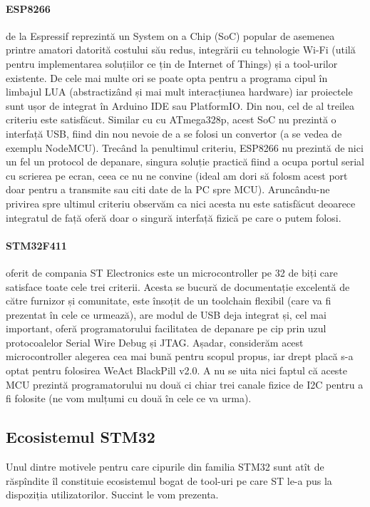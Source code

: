 \paragraph{ESP8266} de la Espressif reprezintă un System on a Chip (SoC) popular de asemenea printre amatori datorită costului său redus, integrării cu tehnologie Wi-Fi (utilă pentru implementarea soluțiilor ce țin de Internet of Things) și a tool-urilor existente. De cele mai multe ori se poate opta pentru a programa cipul în limbajul LUA (abstractizând și mai mult interacțiunea hardware) iar proiectele sunt ușor de integrat în Arduino IDE sau PlatformIO. Din nou, cel de al treilea criteriu este satisfăcut. Similar cu cu ATmega328p, acest SoC nu prezintă o interfață USB\cite{esp_tech}, fiind din nou nevoie de a se folosi un convertor (a se vedea de exemplu NodeMCU). Trecând la penultimul criteriu, ESP8266 nu prezintă de nici un fel un protocol de depanare, singura soluție practică fiind a ocupa portul serial cu scrierea pe ecran, ceea ce nu ne convine (ideal am dori să folosm acest port doar pentru a transmite sau citi date de la PC spre MCU). Aruncându-ne privirea spre ultimul criteriu observăm ca nici acesta nu este satisfăcut deoarece integratul de față oferă doar o singură interfață fizică pe care o putem folosi.

\paragraph{STM32F411} oferit de compania ST Electronics este un microcontroller pe 32 de biți care satisface toate cele trei criterii. Acesta se bucură de documentație excelentă de către furnizor și comunitate, este însoțit de un toolchain flexibil (care va fi prezentat în cele ce urmează), are modul de USB deja integrat și, cel mai important, oferă programatorului facilitatea de depanare pe cip prin uzul protocoalelor Serial Wire Debug și JTAG. Așadar, considerăm acest microcontroller alegerea cea mai bună pentru scopul propus, iar drept placă s-a optat pentru folosirea WeAct BlackPill v2.0. A nu se uita nici faptul că aceste MCU prezintă programatorului nu două ci chiar trei canale fizice de I2C pentru a fi folosite (ne vom mulțumi cu două în cele ce va urma).

\subsection{Ecosistemul STM32}
Unul dintre motivele pentru care cipurile din familia STM32 sunt atît de răspîndite îl constituie ecosistemul bogat de tool-uri pe care ST le-a pus la dispoziția utilizatorilor. Succint le vom prezenta.
